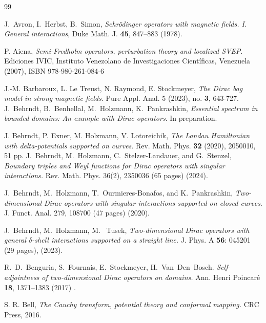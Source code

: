 \documentclass[11pt,a4paper,reqno,oneside]{amsproc}
\numberwithin{equation}{section}
\begin{document}
	
\begin{thebibliography}{99} 

{J.~Avron, I.~Herbst, B.~Simon}, {\em Schr\"odinger operators with magnetic
  fields. {I}. {G}eneral interactions}, Duke Math. J. {\bf 45},
  847--883 (1978).

 P. Aiena, {\em Semi-Fredholm operators, perturbation theory and localized SVEP}. Ediciones IVIC, Instituto Venezolano de Investigaciones Cient\'{i}ficas, Venezuela (2007), ISBN 978-980-261-084-6


 J.-M. Barbaroux, L. Le Treust, N. Raymond, E.  Stockmeyer, {\em The Dirac bag model in strong magnetic fields}. Pure Appl. Anal. 5 (2023), no. {\bf 3}, 643-727.
 J.~Behrndt, B.~Benhellal, M.~Holzmann,  K.~Pankrashkin, {\em Essential spectrum in bounded domains: An example with Dirac operators}. In preparation.

J. Behrndt, P. Exner, M. Holzmann, V. Lotoreichik, {\em The Landau Hamiltonian with delta-potentials supported on curves}. Rev. Math. Phys. {\bf 32} (2020), 2050010, 51 pp.
 J.~Behrndt, M.~Holzmann, C.~Stelzer-Landauer, and G.~Stenzel, {\em Boundary triples and Weyl functions for Dirac operators with singular interactions.} Rev. Math. Phys. 36(2), 2350036 (65 pages) (2024).

J.~Behrndt, M.~Holzmann, T.~Ourmieres-Bonafos, and K.~Pankrashkin, {\em Two-dimensional Dirac operators with singular interactions supported on closed curves}. J. Funct. Anal. 279, 108700 (47 pages) (2020).

J.~Behrndt, M.~Holzmann, M. ~Tusek, \emph{Two-dimensional Dirac operators with general $\delta$-shell interactions
supported on a straight line.} J. Phys. A {\bf 56}: 045201 (29 pages), (2023).

 R.~D.~Benguria, S.~Fournais, E.~Stockmeyer, H.~Van~Den~Bosch. \emph{Self-adjointness of two-dimensional Dirac operators on domains.} Ann. Henri Poincar\'e {\bf 18}, 1371--1383  (2017) .

 S. R. Bell, \emph{The Cauchy transform, potential theory and conformal mapping.} CRC Press, 2016.


\end{thebibliography}
\end{document}
